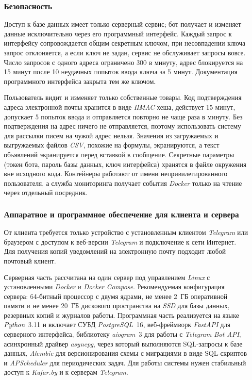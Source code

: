 \subsubsection{Безопасность}

Доступ к базе данных имеет только серверный сервис; бот получает и изменяет данные исключительно через его программный интерфейс. Каждый запрос к интерфейсу сопровождается общим секретным ключом, при несовпадении ключа запрос отклоняется, а если ключ не задан, сервис не обслуживает запросы вовсе. Число запросов с одного адреса ограничено 300 в минуту, адрес блокируется на 15 минут после 10 неудачных попыток ввода ключа за 5 минут. Документация программного интерфейса закрыта тем же ключом.

Пользователь видит и изменяет только собственные товары. Код подтверждения адреса электронной почты хранится в виде \textit{HMAC}-хеша, действует 15 минут, допускает 5 попыток ввода и отправляется повторно не чаще раза в минуту. Без подтверждения на адрес ничего не отправляется, поэтому использовать систему для рассылки писем на чужой адрес нельзя. Значения из загружаемых и выгружаемых файлов \textit{CSV}, похожие на формулы, экранируются, а текст объявлений экранируется перед вставкой в сообщение. Секретные параметры (токен бота, пароль базы данных, ключ интерфейса) хранятся в файле окружения вне исходного кода. Контейнеры работают от имени непривилегированного пользователя, а служба мониторинга получает события \textit{Docker} только на чтение через отдельный посредник.

\subsubsection{Аппаратное и программное обеспечение для клиента и сервера}

От клиента требуется только устройство с установленным клиентом \textit{Telegram} или браузером с доступом к веб-версии \textit{Telegram} и подключение к сети Интернет. Для получения копий уведомлений на электронную почту подходит любой почтовый клиент.

Серверная часть рассчитана на один сервер под управлением \textit{Linux} с установленными \textit{Docker} и \textit{Docker Compose}. Рекомендуемая конфигурация сервера: 64-битный процессор с двумя ядрами, не менее 2~ГБ оперативной памяти и не менее 20~ГБ дискового пространства на \textit{SSD} для базы данных, резервных копий и журналов работы. Программная часть реализуется на языке \textit{Python}~3.11 и включает СУБД \textit{PostgreSQL}~16, веб-фреймворк \textit{FastAPI} для серверного интерфейса, библиотеку \textit{aiogram}~3 для работы с \textit{Telegram Bot API}, асинхронный драйвер \textit{asyncpg}, через который выполняются SQL-запросы к базе данных, \textit{Alembic} для версионирования схемы с миграциями в виде SQL-скриптов и \textit{APScheduler} для периодических задач. Для работы системы нужен стабильный доступ к \textit{Kufar.by} и к серверам \textit{Telegram}.
